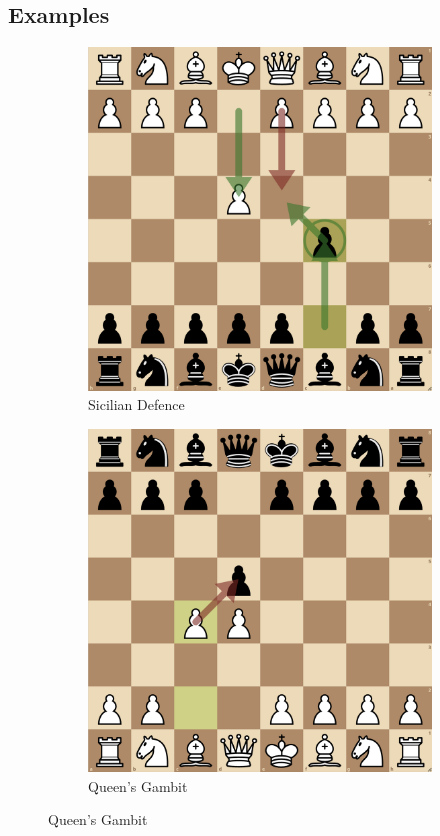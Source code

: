 \documentclass[a4paper, 11pt]{article}
\begin{document}
\begin{appendices}
\section{Examples}
\begin{figure}[H]
    \centering
    \caption{Examples of Chess Openings}
    \label{fig:examplesOfChessOpenings}
    \begin{subfigure}{0.45\textwidth}
        \centering
        \caption{Sicilian Defence}
        \includegraphics[width=\textwidth]{Example of Sicilian Defence.png}
    \end{subfigure}
    \hfill
    \begin{subfigure}{0.45\textwidth}
        \centering
        \caption{Queen's Gambit}
        \includegraphics[width=\textwidth]{Example of Queen's Gambit.png}

\end{subfigure}
\end{figure}
\end{appendices}
\end{document}

